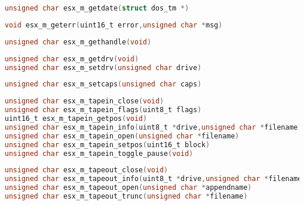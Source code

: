 \documentclass[11pt]{book}
\def\lthtmlcheckvsize{\ifdim\ht\sizebox<\vsize 
  \ifdim\wd\sizebox<\hsize\expandafter\hfill\fi \expandafter\vfill
  \else\expandafter\vss\fi}%
\begin{document}
{\newpage\clearpage
{}%
\begin{lstlisting}[language=C]
unsigned char esx_m_getdate(struct dos_tm *)
\end{lstlisting}%
\lthtmlfigureZ
\lthtmlcheckvsize\clearpage}

{\newpage\clearpage
{}%
\begin{lstlisting}[language=C]
void esx_m_geterr(uint16_t error,unsigned char *msg)
\end{lstlisting}%
\lthtmlfigureZ
\lthtmlcheckvsize\clearpage}

{\newpage\clearpage
{}%
\begin{lstlisting}[language=C]
unsigned char esx_m_gethandle(void)
\end{lstlisting}%
\lthtmlfigureZ
\lthtmlcheckvsize\clearpage}

{\newpage\clearpage
{}%
\begin{lstlisting}[language=C]
unsigned char esx_m_getdrv(void)
unsigned char esx_m_setdrv(unsigned char drive)
\end{lstlisting}%
\lthtmlfigureZ
\lthtmlcheckvsize\clearpage}

{\newpage\clearpage
{}%
\begin{lstlisting}[language=C]
unsigned char esx_m_setcaps(unsigned char caps)
\end{lstlisting}%
\lthtmlfigureZ
\lthtmlcheckvsize\clearpage}

{\newpage\clearpage
{}%
\begin{lstlisting}[language=C]
unsigned char esx_m_tapein_close(void)
unsigned char esx_m_tapein_flags(uint8_t flags)
uint16_t esx_m_tapein_getpos(void)
unsigned char esx_m_tapein_info(uint8_t *drive,unsigned char *filename)
unsigned char esx_m_tapein_open(unsigned char *filename)
unsigned char esx_m_tapein_setpos(uint16_t block)
unsigned char esx_m_tapein_toggle_pause(void)
\end{lstlisting}%
\lthtmlfigureZ
\lthtmlcheckvsize\clearpage}

{\newpage\clearpage
{}%
\begin{lstlisting}[language=C]
unsigned char esx_m_tapeout_close(void)
unsigned char esx_m_tapeout_info(uint8_t *drive,unsigned char *filename)
unsigned char esx_m_tapeout_open(unsigned char *appendname)
unsigned char esx_m_tapeout_trunc(unsigned char *filename)
\end{lstlisting}%
\lthtmlfigureZ
\lthtmlcheckvsize\clearpage}
\end{document}
